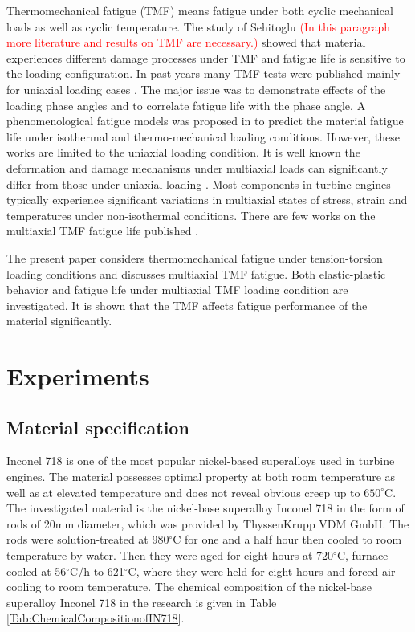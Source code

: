 \documentclass[preprint,5p,twocolumn,11pt,sort&compress]{elsarticle}
\newcommand{\marked}[1]{\textcolor{red}{#1}}
\begin{document}
Thermomechanical fatigue (TMF) means fatigue under both cyclic mechanical loads as well as cyclic temperature. The study of Sehitoglu \marked{(In this paragraph more literature and results on TMF are necessary.)} showed that material experiences different damage processes under TMF and fatigue life is sensitive to the loading configuration. In past years many TMF tests were published mainly for uniaxial loading cases \cite{Evans2008, Kulawinski2015, Remy2003, Bauer2009}. The major issue was to demonstrate effects of the loading phase angles and to correlate fatigue life with the phase angle. A phenomenological fatigue models was proposed  in \cite{Vose2013} to predict the material fatigue life under isothermal and thermo-mechanical loading conditions. However, these works are limited to the uniaxial loading condition. It is well known the deformation and damage mechanisms under multiaxial loads can significantly differ from those under uniaxial loading \cite{Fang2015, Kang2004, Chen2004}. Most components in turbine engines typically experience significant variations in multiaxial states of stress, strain and temperatures under non-isothermal conditions. There are few works on the multiaxial TMF fatigue life published \cite{Brookes2010}.

The present paper considers thermomechanical fatigue under tension-torsion loading conditions and discusses multiaxial TMF fatigue. Both elastic-plastic behavior and fatigue life under multiaxial TMF loading condition are investigated. It is shown that the TMF affects fatigue performance of the material significantly.

\section{Experiments}
\subsection{Material specification}
Inconel 718 is one of the most popular nickel-based superalloys used in turbine engines. The material possesses optimal property at both room temperature as well as at elevated temperature and does not reveal obvious creep up to $650^\circ$C.  The investigated material is the nickel-base superalloy Inconel 718 in the form of rods of 20mm diameter, which was provided by ThyssenKrupp VDM GmbH.
The rods were solution-treated at 980$^{\circ}$C for one and a half hour then cooled to room temperature by water.
Then they were aged for eight hours at 720$^{\circ}$C, furnace cooled at 56$^{\circ}$C/h to 621$^{\circ}$C, where they were held for eight hours and forced air cooling to room temperature.
The chemical composition of the nickel-base superalloy Inconel 718 in the research is given in Table \ref{Tab:ChemicalCompositionofIN718}.
\end{document}

